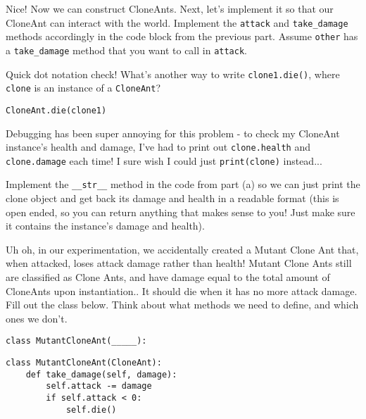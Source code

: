 \question Nice! Now we can construct CloneAnts. Next, let's implement it so that our CloneAnt can interact with the world. 
Implement the \texttt{attack} and \texttt{take\_damage} methods accordingly in the code block from the previous part. Assume \texttt{other} has a \texttt{take\_damage} method that you want to call in \texttt{attack}.

Quick dot notation check! What's another way to write \texttt{clone1.die()}, where \texttt{clone} is an instance of a \texttt{CloneAnt}?

\begin{solution}
\begin{lstlisting}
CloneAnt.die(clone1)
\end{lstlisting}
\end{solution}

\question Debugging has been super annoying for this problem - to check my CloneAnt instance's health and damage, I've had to print out \texttt{clone.health} and \texttt{clone.damage} each time! I sure wish I could just \texttt{print(clone)} instead...

Implement the \texttt{\_\_str\_\_} method in the code from part (a) so we can just print the clone object and get back its damage and health in a readable format (this is open ended, so you can return anything that makes sense to you! Just make sure it contains the instance's damage and health).

\question Uh oh, in our experimentation, we accidentally created a Mutant Clone Ant that, when attacked, loses attack damage rather than health! Mutant Clone Ants still are classified as Clone Ants, and have damage equal to the total amount of CloneAnts upon instantiation.. It should die when it has no more attack damage. Fill out the class below. Think about what methods we need to define, and which ones we don't.

\begin{lstlisting}
class MutantCloneAnt(_____):

\end{lstlisting}

\begin{solution}[1.0in]
\begin{lstlisting}
class MutantCloneAnt(CloneAnt):
    def take_damage(self, damage):
        self.attack -= damage
        if self.attack < 0:
            self.die()
\end{lstlisting}
\end{solution}
